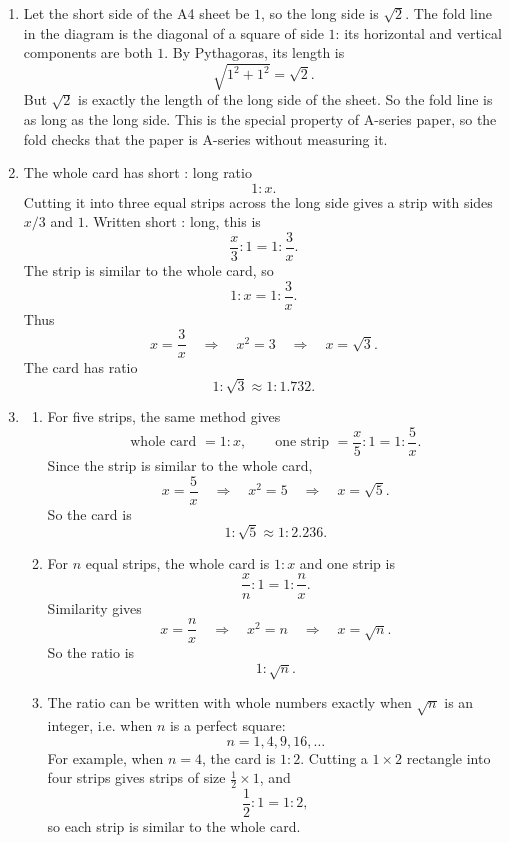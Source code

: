 \documentclass[11pt,a4paper]{article}
\begin{document}
\begin{enumerate}[label=\textbf{Q\arabic*.}, leftmargin=*, itemsep=1.2em]
\begin{enumerate}[label=(\alph*)]
\item A4 to A1 is three sizes up, so lengths are multiplied by
\[
(\sqrt2)^3=2\sqrt2\approx 2.828.
\]
Therefore about \(283\%\) turns A4 into A1.
\end{enumerate}

\item
Let the short side of the A4 sheet be \(1\), so the long side is \(\sqrt2\). The fold line in the diagram is the diagonal of a square of side \(1\): its horizontal and vertical components are both \(1\). By Pythagoras, its length is
\[
\sqrt{1^2+1^2}=\sqrt2.
\]
But \(\sqrt2\) is exactly the length of the long side of the sheet. So the fold line is as long as the long side. This is the special property of A-series paper, so the fold checks that the paper is A-series without measuring it.

\item
The whole card has short : long ratio
\[
1:x.
\]
Cutting it into three equal strips across the long side gives a strip with sides \(x/3\) and \(1\). Written short : long, this is
\[
\frac x3:1=1:\frac3x.
\]
The strip is similar to the whole card, so
\[
1:x=1:\frac3x.
\]
Thus
\[
x=\frac3x
\quad\Longrightarrow\quad
x^2=3
\quad\Longrightarrow\quad
x=\sqrt3.
\]
The card has ratio
\[
1:\sqrt3\approx 1:1.732.
\]

\item
\begin{enumerate}[label=(\alph*)]
\item For five strips, the same method gives
\[
\text{whole card }=1:x,
\qquad
\text{one strip }=\frac x5:1=1:\frac5x.
\]
Since the strip is similar to the whole card,
\[
x=\frac5x
\quad\Longrightarrow\quad
x^2=5
\quad\Longrightarrow\quad
x=\sqrt5.
\]
So the card is
\[
1:\sqrt5\approx 1:2.236.
\]

\item For \(n\) equal strips, the whole card is \(1:x\) and one strip is
\[
\frac xn:1=1:\frac nx.
\]
Similarity gives
\[
x=\frac nx
\quad\Longrightarrow\quad
x^2=n
\quad\Longrightarrow\quad
x=\sqrt n.
\]
So the ratio is
\[
1:\sqrt n.
\]

\item The ratio can be written with whole numbers exactly when \(\sqrt n\) is an integer, i.e. when \(n\) is a perfect square:
\[
n=1,4,9,16,\ldots
\]
For example, when \(n=4\), the card is \(1:2\). Cutting a \(1\times2\) rectangle into four strips gives strips of size \(\frac12\times1\), and
\[
\frac12:1=1:2,
\]
so each strip is similar to the whole card.
\end{enumerate}


\end{enumerate}
\end{document}
